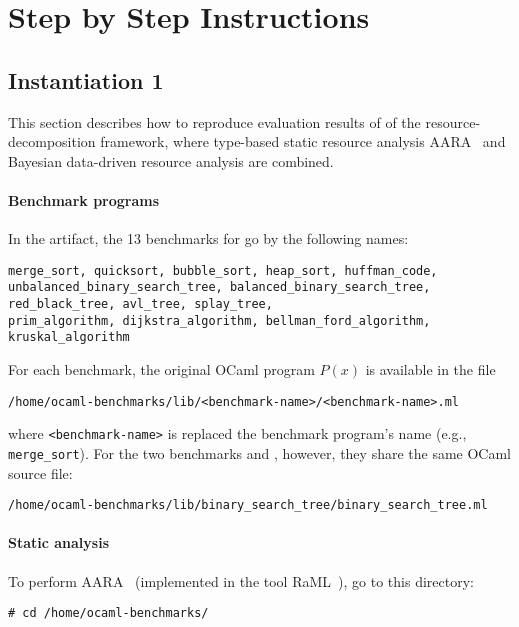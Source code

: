 
\section{Step by Step Instructions}
\label{sec:step-by-step-instructions}

\subsection{Instantiation 1}
\label{sec:step-by-step-instructions:instantiation-1}

This section describes how to reproduce evaluation results of
 of the resource-decomposition
framework, where type-based static resource analysis
AARA~\citep{Hoffmann2011a,Hoffmann2017} and Bayesian data-driven resource
analysis are combined.

\paragraph{Benchmark programs}

In the artifact, the 13 benchmarks for 
go by the following names:
\begin{verbatim}
merge_sort, quicksort, bubble_sort, heap_sort, huffman_code,
unbalanced_binary_search_tree, balanced_binary_search_tree,
red_black_tree, avl_tree, splay_tree,
prim_algorithm, dijkstra_algorithm, bellman_ford_algorithm, kruskal_algorithm
\end{verbatim}
%
For each benchmark, the original OCaml program $P(x)$ is available in the file
\begin{verbatim}
/home/ocaml-benchmarks/lib/<benchmark-name>/<benchmark-name>.ml
\end{verbatim}
where \texttt{<benchmark-name>} is replaced the benchmark program's name (e.g.,
\texttt{merge\_sort}).
%
For the two benchmarks \unbalancedbst{} and \balancedbst{}, however, they share
the same OCaml source file:
\begin{verbatim}
/home/ocaml-benchmarks/lib/binary_search_tree/binary_search_tree.ml
\end{verbatim}

\paragraph{Static analysis}

To perform AARA~\citep{Hoffmann2011a,Hoffmann2017} (implemented in the tool
RaML~\citep{RaML}), go to this directory:
\begin{verbatim}
# cd /home/ocaml-benchmarks/
\end{verbatim}

